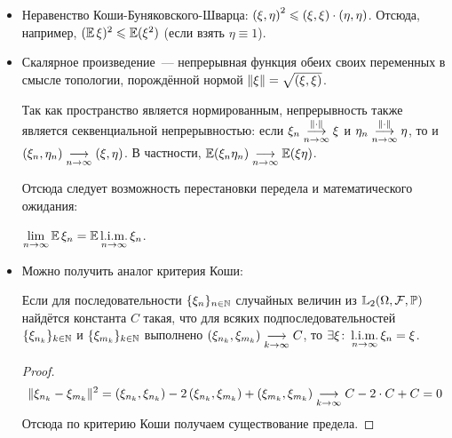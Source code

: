\begin{itemize}
    \item
        Неравенство Коши-Буняковского-Шварца: $ \dotprod{\xi}{\eta}^2 \leqslant \dotprod{\xi}{\xi} \cdot \dotprod{\eta}{\eta} $.
        Отсюда, например, $ (\expect \xi)^2 \leqslant \expect (\xi^2) $ (если взять $ \eta \equiv 1 $).
    \item
        Скалярное произведение~--- непрерывная функция обеих своих переменных в смысле топологии,
        порождённой нормой $ \| \xi \| = \sqrt{\dotprod{\xi}{\xi}} $.

        Так как пространство является нормированным, непрерывность также является секвенциальной непрерывностью:
        если $ \xi_n \limarrow[\convnorm]{n \to \infty} \xi $ и $ \eta_n \limarrow[\convnorm]{n \to \infty} \eta $, то и $ \dotprod{\xi_n}{\eta_n} \limarrow{n \to \infty} \dotprod{\xi}{\eta} $.
        В частности, $ \expect (\xi_n \eta_n) \limarrow{n \to \infty} \expect (\xi \eta) $.

        Отсюда следует возможность перестановки передела и математического ожидания:
        \begin{statement}
            \label{statement:calculus:swap_expectation_and_limit}
            $ \displaystyle \lim_{n \to \infty} \expect \xi_n = \expect \limmeansq_{n \to \infty} \xi_n $.
        \end{statement}
    \item
        Можно получить аналог критерия Коши:
        \begin{statement}
            \label{statement:calculus:dotprod_converges_to_const}
            Если для последовательности $ \{ \xi_n \}_{n \in \naturals} $ случайных величин из $ \lebesgue_2 (\Omega, \setfamily, \proba) $
            найдётся константа $ C $ такая, что для всяких подпоследовательностей $ \{ \xi_{n_k} \}_{k \in \naturals} $ и $ \{ \xi_{m_k} \}_{k \in \naturals} $
            выполнено $ \dotprod{\xi_{n_k}}{\xi_{m_k}} \limarrow{k \to \infty} C $,
            то $ \displaystyle \exists \xi \colon \limmeansq_{n \to \infty} \xi_n = \xi $.
        \end{statement}

        \begin{proof}
            \[
                \| \xi_{n_k} - \xi_{m_k} \|^2 = \dotprod{\xi_{n_k}}{\xi_{n_k}} - 2 \dotprod{\xi_{n_k}}{\xi_{m_k}} + \dotprod{\xi_{m_k}}{\xi_{m_k}} \limarrow{k \to \infty} C - 2 \cdot C + C = 0
            \]
            Отсюда по критерию Коши получаем существование предела.
        \end{proof}
\end{itemize}


